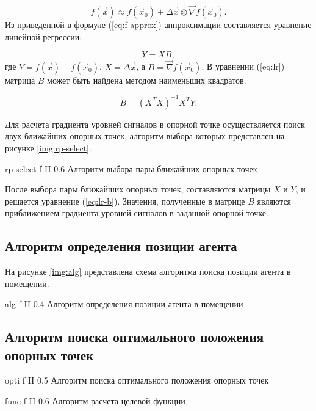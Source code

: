 \begin{equation}
    f(\vec{x}) \approx f(\vec{x}_0) + \Delta \vec{x} \otimes \vec{\nabla} f(\vec{x}_0).
    \label{eq:f-approx}
\end{equation}
Из приведенной в формуле (\ref{eq:f-approx}) аппроксимации составляется уравнение линейной регрессии:

\begin{equation}
    Y = XB,
    \label{eq:lr}
\end{equation}
где $Y = f(\vec{x}) - f (\vec{x}_0)$, $X = \Delta \vec{x}$, а $B = \vec{\nabla} f(\vec{x}_0)$. В уравнении (\ref{eq:lr}) матрица $B$ может быть найдена методом наименьших квадратов.

\begin{equation}
    B = (X^TX)^{-1}X^TY.
    \label{eq:lr-b}
\end{equation}

Для расчета градиента уровней сигналов в опорной точке осуществляется поиск двух ближайших опорных точек, алгоритм выбора которых представлен на рисунке \ref{img:rp-select}.

    {rp-select}
    {f}
    {H}
    {0.6\linewidth}
    {Алгоритм выбора пары ближайших опорных точек}

После выбора пары ближайших опорных точек, составляются матрицы $X$ и $Y$, и решается уравнение (\ref{eq:lr-b}). Значения, полученные в матрице $B$ являются приближением градиента уровней сигналов в заданной опорной точке.

\subsection{Алгоритм определения позиции агента}

На рисунке \ref{img:alg} представлена схема алгоритма поиска позиции агента в помещении.

    {alg}
    {f}
    {H}
    {0.4\linewidth}
    {Алгоритм определения позиции агента в помещении}

\subsection{Алгоритм поиска оптимального положения опорных точек}

    {opti}
    {f}
    {H}
    {0.5\linewidth}
    {Алгоритм поиска оптимального положения опорных точек}

    {func}
    {f}
    {H}
    {0.6\linewidth}
    {Алгоритм расчета целевой функции}

